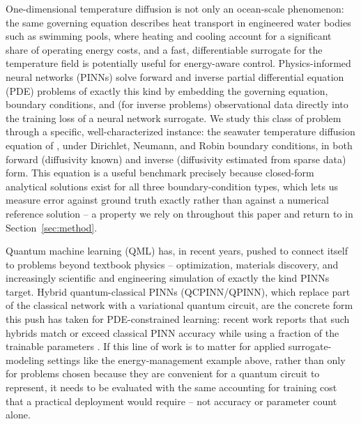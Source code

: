 
One-dimensional temperature diffusion is not only an ocean-scale
phenomenon: the same governing equation describes heat transport in
engineered water bodies such as swimming pools, where heating and cooling
account for a significant share of operating energy costs, and a fast,
differentiable surrogate for the temperature field is potentially useful
for energy-aware control. Physics-informed neural networks (PINNs)
\citep{raissi2019pinn} solve forward and inverse partial differential
equation (PDE) problems of exactly this kind by embedding the governing
equation, boundary conditions, and (for inverse problems) observational
data directly into the training loss of a neural network surrogate. We
study this class of problem through a specific, well-characterized
instance: the seawater temperature diffusion equation of
\citet{han2026seawater}, under Dirichlet, Neumann, and Robin boundary
conditions, in both forward (diffusivity known) and inverse (diffusivity
estimated from sparse data) form. This equation is a useful benchmark
precisely because closed-form analytical solutions exist for all three
boundary-condition types, which lets us measure error against ground
truth exactly rather than against a numerical reference solution -- a
property we rely on throughout this paper and return to in
Section~\ref{sec:method}.

Quantum machine learning (QML) has, in recent years, pushed to connect
itself to problems beyond textbook physics -- optimization, materials
discovery, and increasingly scientific and engineering simulation of
exactly the kind PINNs target. Hybrid quantum-classical PINNs
(QCPINN/QPINN), which replace part of the classical network with a
variational quantum circuit, are the concrete form this push has taken
for PDE-constrained learning: recent work reports that such hybrids match
or exceed classical PINN accuracy while using a fraction of the trainable
parameters \citep{farea2025qcpinn}. If this line of work is to matter for
applied surrogate-modeling settings like the energy-management example
above, rather than only for problems chosen because they are convenient
for a quantum circuit to represent, it needs to be evaluated with the
same accounting for training cost that a practical deployment would
require -- not accuracy or parameter count alone.

